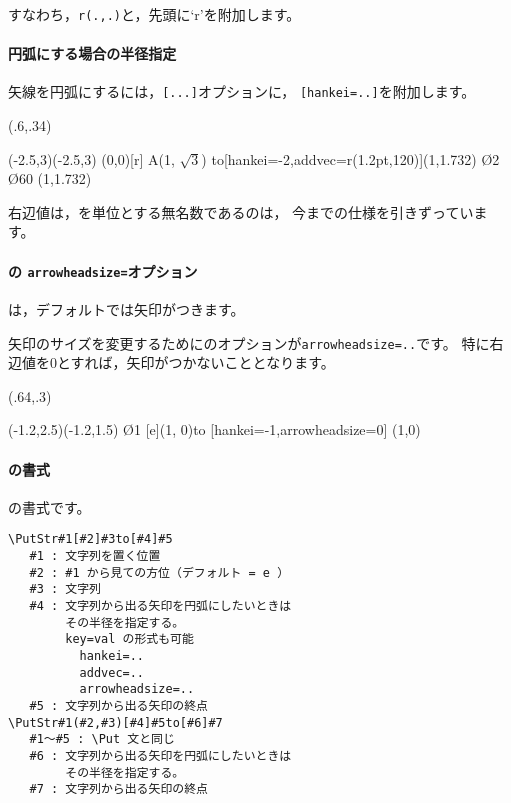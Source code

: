 すなわち，\verb+r(.,.)+と，先頭に`r'を附加します。

\paragraph{円弧にする場合の半径指定}
矢線を円弧にするには，\verb+[...]+オプションに，
\verb+[hankei=..]+を附加します。

\begin{showEx}(.6,.34){}
  \begin{zahyou}[ul=7.5mm](-2.5,3)(-2.5,3)
    \def\A{(1,1.732)}
    (0,0)[r]%
      {A(1, $\sqrt3$)}%
      to[hankei=-2,addvec={r(1.2pt,120)}]\A
    \En\O{2}
    \kTyokusen\O{60}{}{}
    \Kuromaru\A
  \end{zahyou}
\end{showEx}

右辺値は，を単位とする無名数であるのは，
今までの仕様を引きずっています。

\paragraph{ の \texttt{arrowheadsize=}オプション}
は，デフォルトでは矢印がつきます。

矢印のサイズを変更するためにのオプションが\verb+arrowheadsize=..+です。
特に右辺値を0とすれば，矢印がつかないこととなります。

\begin{showEx}(.64,.3){}
\begin{zahyou}[ul=10mm](-1.2,2.5)(-1.2,1.5)
  \En\O{1}
  [e]{(1, 0)}to
    [hankei=-1,arrowheadsize=0]%
    {(1,0)}
\end{zahyou}
\end{showEx}

\paragraph{の書式}
の書式です。

\begin{boxnote}
\begin{verbatim}
\PutStr#1[#2]#3to[#4]#5
   #1 : 文字列を置く位置
   #2 : #1 から見ての方位（デフォルト = e ）
   #3 : 文字列
   #4 : 文字列から出る矢印を円弧にしたいときは
        その半径を指定する。
        key=val の形式も可能
          hankei=..
          addvec=..
          arrowheadsize=..
   #5 : 文字列から出る矢印の終点
\PutStr#1(#2,#3)[#4]#5to[#6]#7
   #1〜#5 : \Put 文と同じ
   #6 : 文字列から出る矢印を円弧にしたいときは
        その半径を指定する。
   #7 : 文字列から出る矢印の終点
\end{verbatim}
\end{boxnote}

